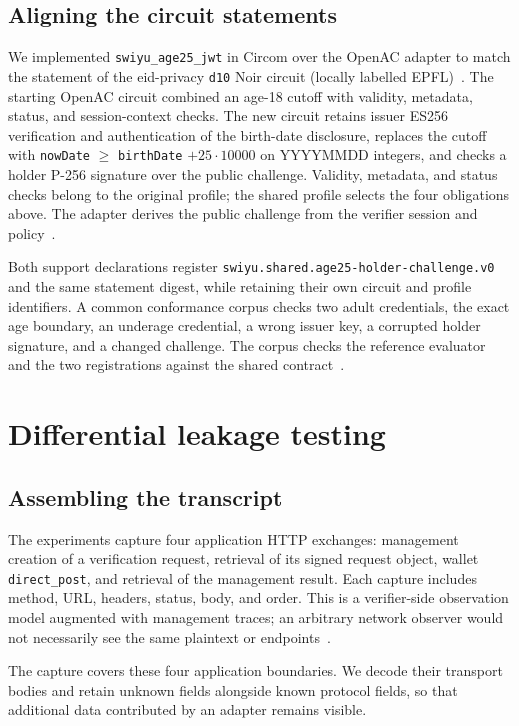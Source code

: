 \documentclass[10pt,twocolumn,letterpaper]{article}
\newcommand{\code}[1]{\texttt{#1}}
\begin{document}
\subsection{Aligning the circuit statements}
We implemented \code{swiyu\_age25\_jwt} in Circom over the OpenAC adapter to match the statement of the eid-privacy \code{d10} Noir circuit (locally labelled EPFL)~\cite{openac,epfl}. The starting OpenAC circuit combined an age-18 cutoff with validity, metadata, status, and session-context checks. The new circuit retains issuer ES256 verification and authentication of the birth-date disclosure, replaces the cutoff with \code{nowDate} $\geq$ \code{birthDate} $+25\cdot 10000$ on YYYYMMDD integers, and checks a holder P-256 signature over the public challenge. Validity, metadata, and status checks belong to the original profile; the shared profile selects the four obligations above. The adapter derives the public challenge from the verifier session and policy~\cite{artifact}.

Both support declarations register \code{swiyu.shared.age25-}\allowbreak\code{holder-challenge.v0} and the same statement digest, while retaining their own circuit and profile identifiers. A common conformance corpus checks two adult credentials, the exact age boundary, an underage credential, a wrong issuer key, a corrupted holder signature, and a changed challenge. The corpus checks the reference evaluator and the two registrations against the shared contract~\cite{artifact}.

\section{Differential leakage testing}
\subsection{Assembling the transcript}
The experiments capture four application HTTP exchanges: management creation of a verification request, retrieval of its signed request object, wallet \code{direct\_post}, and retrieval of the management result. Each capture includes method, URL, headers, status, body, and order. This is a verifier-side observation model augmented with management traces; an arbitrary network observer would not necessarily see the same plaintext or endpoints~\cite{artifact}.

The capture covers these four application boundaries. We decode their transport bodies and retain unknown fields alongside known protocol fields, so that additional data contributed by an adapter remains visible.
\end{document}
